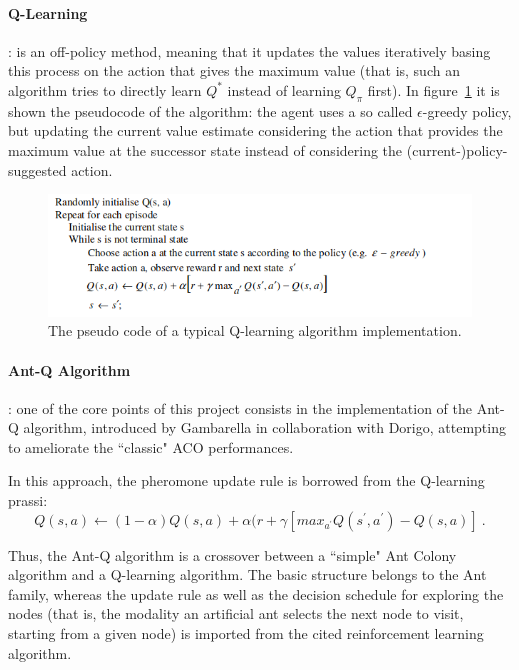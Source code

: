 \documentclass[10pt]{article}
\begin{document}
\paragraph{Q-Learning}: 
is  an  off-policy  method, meaning  that  it updates the values  iteratively basing this process on  the  action that  gives  the  maximum  value  (that is, such an algorithm tries to directly  learn $Q^*$  instead  of  learning $Q_\pi$ first). In figure~\ref{fig:q_pseudo} it is shown the pseudocode of the algorithm:  the  agent  uses  a  so called $\epsilon$-greedy  policy,  but  updating the  current  value  estimate  considering the  action  that  provides  the  maximum  value  at  the successor state instead of considering the (current-)policy-suggested action. 
\begin{figure}
\centering \includegraphics[scale=0.6]{figs/q_pseudo.png}
\caption{\label{fig:q_pseudo} The pseudo code of a typical Q-learning algorithm implementation.}
\end{figure}

\paragraph{Ant-Q Algorithm}:
one of the core points of this project consists in the implementation of the Ant-Q algorithm, introduced by Gambarella \cite{undici} in collaboration with Dorigo, attempting to ameliorate the ``classic" ACO performances.  

In this approach, the pheromone update rule  is borrowed from the Q-learning prassi:
\begin{equation}
Q(s,a) \leftarrow (1-\alpha) Q(s,a) + \alpha (r + \gamma [max_{a^{'}} Q(s^{'},a^{'})-Q(s,a)]~.
\label{eq:q-eq}
\end{equation}

Thus, the Ant-Q algorithm is a crossover between a ``simple" Ant Colony algorithm and a Q-learning algorithm. The basic structure belongs to the Ant family, whereas the update rule as well as the decision schedule for exploring the nodes (that is, the modality an artificial ant selects the next node to visit, starting from a given node) is imported from the cited reinforcement learning algorithm.
\end{document}
